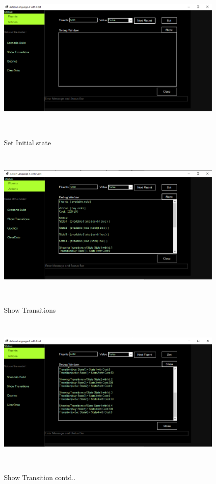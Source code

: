 \documentclass[11pt]{article}
\begin{document}
	\begin{figure}[H]
		\centering
		\includegraphics[width=6in,height=3in]{./testImages/Example2/img4.png}
		\label{Figure:f02.4}
		\caption{Set Initial state}
	\end{figure}
	\begin{figure}[H]
		\centering
		\includegraphics[width=6in,height=3in]{./testImages/Example2/img5.png}
		\label{Figure:f02.5}
		\caption{Show Transitions}
	\end{figure}
		\begin{figure}[H]
		\centering
		\includegraphics[width=6in,height=3in]{./testImages/Example2/img6.png}
		\label{Figure:f02.6}
		\caption{Show Transition contd..}
	\end{figure}
\end{document}
